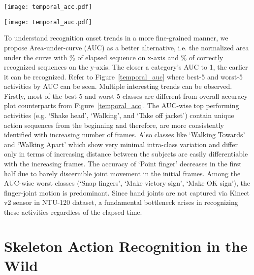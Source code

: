 \documentclass[twocolumn]{svjour3}          \smartqed  \usepackage{graphicx}
\begin{document}
\begin{figure*}
\centering
\begin{minipage}[b]{.47\textwidth}
\texttt{[image: temporal\_acc.pdf]}
\caption{Early recognition curves for best-5, worst-5 classes of MS-G3D model on NTU-120 Cross Subject with classwise accuracy as the measure.}\label{temporal_acc}
\end{minipage}
\qquad
\begin{minipage}[b]{.47\textwidth}
\texttt{[image: temporal\_auc.pdf]}
\caption{Early recognition curves for best-5, worst-5 classes of MS-G3D model on NTU -120 Cross Subject with AUC as the measure.}\label{temporal_auc}
\end{minipage}
\end{figure*}

To understand recognition onset trends in a more fine-grained manner, we propose Area-under-curve (AUC) as a better alternative, i.e. the normalized area under the curve with \% of elapsed sequence on x-axis and \% of correctly recognized sequences on the y-axis. The closer a category's AUC to 1, the earlier it can be recognized. Refer to Figure~\ref{temporal_auc} where best-5 and worst-5 activities by AUC can be seen. Multiple interesting trends can be observed. Firstly, most of the best-5 and worst-5 classes are different from overall accuracy plot counterparts from Figure~\ref{temporal_acc}. The AUC-wise top performing activities (e.g. `Shake head', `Walking', and `Take off jacket') contain unique action sequences from the beginning and therefore, are more consistently identified with increasing number of frames.  Also classes like `Walking Towards' and `Walking Apart' which show very minimal intra-class variation and differ only in terms of increasing distance between the subjects are easily differentiable with the increasing frames. The accuracy of `Point finger' decreases in the first half due to barely discernible joint movement in the initial frames. Among the AUC-wise worst classes (`Snap fingers', `Make victory sign', `Make OK sign'), the finger-joint motion is predominant. Since hand joints are not captured via Kinect v2 sensor in NTU-120 dataset, a fundamental bottleneck arises in recognizing these activities regardless of the elapsed time.


\section{Skeleton Action Recognition in the Wild}
\label{sec:skwild}
\end{document}
